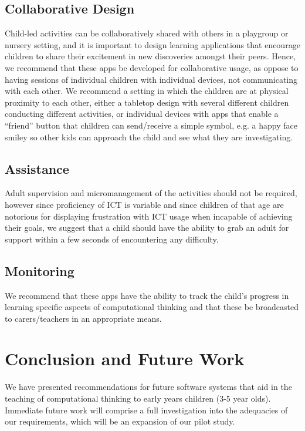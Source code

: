 \documentclass{sig-alternate}
\begin{document}
\subsection*{Collaborative Design} 
Child-led activities can be collaboratively shared with others in a playgroup or nursery setting, and it is important to design learning applications that encourage children to share their excitement in new discoveries amongst their peers. Hence, we recommend that these apps be developed for collaborative usage, as oppose to having sessions of individual children with individual devices, not communicating with each other. We recommend a setting in which the children are at physical proximity to each other,  either a tabletop design with several different children conducting different activities, or individual devices with apps that enable a ``friend'' button that children can send/receive a simple symbol, e.g. a happy face smiley so other kids can approach the child and see what they are investigating. 
\subsection*{Assistance}
Adult supervision and micromanagement of the activities should not be required, however since proficiency of ICT is variable and since children of that age are notorious for displaying frustration with ICT  usage when incapable of achieving their goals, we suggest that a child should have the ability to grab an adult for support within a few seconds of encountering any difficulty.
\subsection*{Monitoring}
We recommend that these apps have the ability to track the child's progress in learning specific aspects of computational thinking and that these be broadcasted to carers/teachers in an appropriate means. 

\section{Conclusion and Future Work}
We have presented recommendations for future software systems that aid in the teaching of computational thinking to early years children (3-5 year olds). Immediate future work will comprise a full investigation into the adequacies of our requirements, which will be an expansion of our pilot study.



\end{document}
